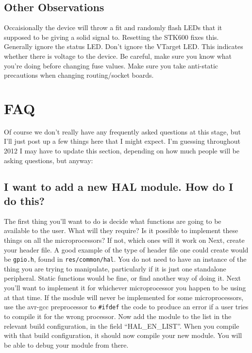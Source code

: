 \documentclass[a4paper, oneside, 11pt, titlepage, onecolumn, openright]{report}
\begin{document}
{{\section{Other Observations}
			\label{s:STK600OtherObservations}			 
			 Occaisionally the device will throw a fit and randomly flash LEDs that it supposed to be giving a solid signal to. Resetting the STK600 fixes this. \newline
			 Generally ignore the status LED.\newline
			 Don't ignore the VTarget LED. This indicates whether there is voltage to the device.\newline
			 Be careful, make sure you know what you're doing before changing fuse values.\newline
			 Make sure you take anti-static precautions when changing routing/socket boards.
			 
\chapter{FAQ}
			\label{C:FAQ}
			Of course we don't really have any frequently asked questions at this stage, but I'll just post up a few things here that I might expect. I'm guessing throughout 2012 I may have to update this section, depending on how much people will be asking questions, but anyway:
			
\section{I want to add a new HAL module. How do I do this?}
			\label{s:FAQNewHAL}
			The first thing you'll want to do is decide what functions are going to be available to the user. What will they require? Is it possible to implement these things on all the microprocessors? If not, which ones will it work on\newline
			Next, create your header file. A good example of the type of header file one could create would be \texttt{gpio.h}, found in \texttt{res/common/hal}. You do not need to have an instance of the thing you are trying to manipulate, particularly if it is just one standalone peripheral. Static functions would be fine, or find another way of doing it.\newline
			Next you'll want to implement it for whichever microprocessor you happen to be using at that time. If the module will never be implemented for some microprocessors, use the avr-gcc preprocessor to \texttt{\#ifdef} the code to produce an error if a user tries to compile it for the wrong processor.\newline
			Now add the module to the list in the relevant build configuration, in the field ``HAL\_EN\_LIST''. When you compile with that build configuration, it should now compile your new module. You will be able to debug your module from there.
			
}}
\end{document}
